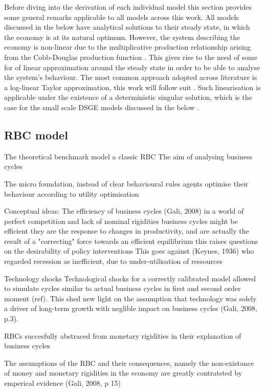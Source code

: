 \documentclass[12pt,a4paper,english]{article} %
\begin{document}
	Before diving into the derivation of each individual model this section provides some general remarks applicable to all models across this work. All models discussed in the below have analytical solutions to their steady state, in which the economy is at its natural optimum. However, the system describing the economy is non-linear due to the multiplicative production relationship arising from the Cobb-Douglas production function \cite{campbell_inspecting_1994}. This gives rise to the need of some for of linear approximation around the steady state in order to be able to analyse the system's behaviour. The most common approach adopted across literature is a log-linear Taylor approximation, this work will follow suit \cite{campbell_inspecting_1994}. Such linearisation is applicable under the existence of a deterministic singular solution, which is the case for the small scale DSGE models discussed in the below \cite{herbst_bayesian_2016}.
	
	
	\subsection{RBC model}
	The theoretical benchmark model a classic RBC 
	The aim of analysing business cycles
	
	The micro foundation, instead of clear behavioural rules agents optimise their behaviour according to utility optimisation
	
	Conceptual ideas:
	The efficiency of business cycles (Gali, 2008)
	in a world of perfect competition and lack of nominal rigidities business cycles might be efficient
	they are the response to changes in productivity, and are actually the result of a "correcting" force towards an efficient equilibrium
	this raises questions on the desirability of policy interventions
	This goes against (Keynes, 1936) who regarded recession as inefficient, due to under-utilisation of ressources
	
	Technology shocks
	Technological shocks for a correctly calibrated model allowed to simulate cycles similar to actual business cycles in first and second order moment (ref). This shed new light on the assumption that technology was solely a driver of long-term growth with neglible impact on business cycles (Gali, 2008, p.3).
	
	RBCs succesfully abstraced from monetary rigidities in their explanation of business cycles
	
	The assumptions of the RBC and their consequences, namely the non-existance of money and monetary rigidities in the economy are greatly contratsted by emperical evidence (Gali, 2008, p 15)
	
\end{document}

